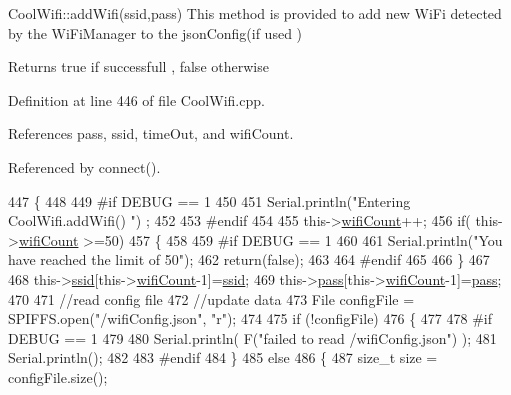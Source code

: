 Cool\+Wifi\+::add\+Wifi(ssid,pass) This method is provided to add new Wi\+Fi detected by the Wi\+Fi\+Manager to the json\+Config(if used )

\begin{DoxyReturn}{Returns}
true if successfull , false otherwise 
\end{DoxyReturn}


Definition at line 446 of file Cool\+Wifi.\+cpp.



References pass, ssid, time\+Out, and wifi\+Count.



Referenced by connect().


\begin{DoxyCode}
447 \{
448 
449 \textcolor{preprocessor}{#if DEBUG == 1}
450     
451     Serial.println(\textcolor{stringliteral}{"Entering CoolWifi.addWifi() "}) ;
452 
453 \textcolor{preprocessor}{#endif  }
454     
455     this->\hyperlink{classCoolWifi_ab133bd92fcb895b884deecd6678592e4}{wifiCount}++;
456     \textcolor{keywordflow}{if}( this->\hyperlink{classCoolWifi_ab133bd92fcb895b884deecd6678592e4}{wifiCount} >=50)
457     \{
458     
459 \textcolor{preprocessor}{    #if DEBUG == 1}
460 
461         Serial.println(\textcolor{stringliteral}{"You have reached the limit of 50"});
462         \textcolor{keywordflow}{return}(\textcolor{keyword}{false});  
463     
464 \textcolor{preprocessor}{    #endif}
465 
466     \}
467 
468     this->\hyperlink{classCoolWifi_a893b21d0fed821438733bba2e73fb4c2}{ssid}[this->\hyperlink{classCoolWifi_ab133bd92fcb895b884deecd6678592e4}{wifiCount}-1]=\hyperlink{classCoolWifi_a893b21d0fed821438733bba2e73fb4c2}{ssid};
469     this->\hyperlink{classCoolWifi_a0c3332a149245aaad060b32593a54c9b}{pass}[this->\hyperlink{classCoolWifi_ab133bd92fcb895b884deecd6678592e4}{wifiCount}-1]=\hyperlink{classCoolWifi_a0c3332a149245aaad060b32593a54c9b}{pass};
470     
471     \textcolor{comment}{//read config file}
472     \textcolor{comment}{//update data}
473     File configFile = SPIFFS.open(\textcolor{stringliteral}{"/wifiConfig.json"}, \textcolor{stringliteral}{"r"});
474 
475     \textcolor{keywordflow}{if} (!configFile) 
476     \{
477     
478 \textcolor{preprocessor}{    #if DEBUG == 1 }
479 
480         Serial.println( F(\textcolor{stringliteral}{"failed to read /wifiConfig.json"}) );
481         Serial.println();
482 
483 \textcolor{preprocessor}{    #endif}
484     \}
485     \textcolor{keywordflow}{else}
486     \{
487         \textcolor{keywordtype}{size\_t} size = configFile.size();

\end{DoxyCode}
